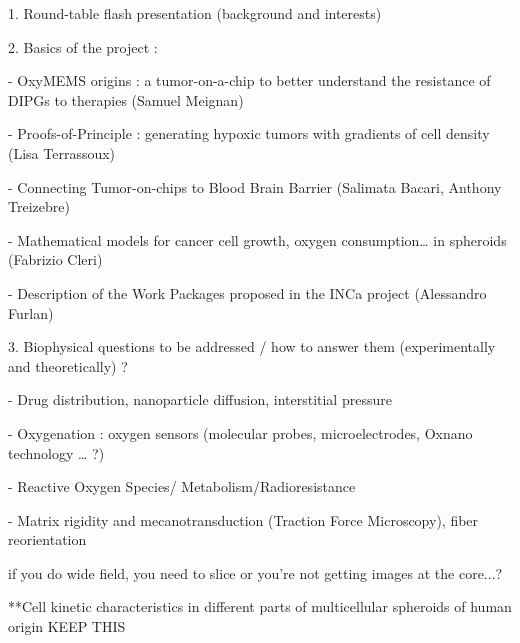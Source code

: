 \documentclass[11pt,a4paper]{article}
\begin{document}



1.      Round-table flash presentation (background and interests)

2.      Basics of the project :

-        OxyMEMS origins : a tumor-on-a-chip to better understand the resistance of DIPGs to therapies (Samuel Meignan) 

-        Proofs-of-Principle : generating hypoxic tumors with gradients of cell density (Lisa Terrassoux) 

-        Connecting Tumor-on-chips to Blood Brain Barrier (Salimata Bacari, Anthony Treizebre)

-        Mathematical models for cancer cell growth, oxygen consumption… in spheroids (Fabrizio Cleri) 

-        Description of the Work Packages proposed in the INCa project (Alessandro Furlan)

3.      Biophysical questions to be addressed / how to answer them (experimentally and theoretically) ?

-        Drug distribution, nanoparticle diffusion, interstitial pressure

-        Oxygenation : oxygen sensors (molecular probes, microelectrodes, Oxnano technology … ?)

-        Reactive Oxygen Species/ Metabolism/Radioresistance

-        Matrix rigidity and mecanotransduction (Traction Force Microscopy), fiber reorientation

if you do wide field, you need to slice or you're not getting images at the core...?


**Cell kinetic characteristics in different parts of multicellular spheroids of human origin KEEP THIS


\newpage


\end{document}

